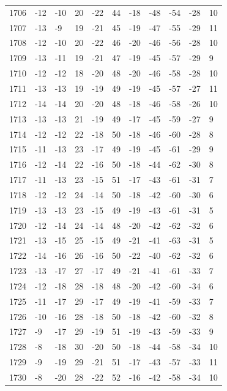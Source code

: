 \begin{table}[H]
\begin{tabular}{lllllllllll}
1706 & -12 & -10 & 20 & -22 & 44 & -18 & -48 & -54 & -28 & 10 \\
1707 & -13 & -9 & 19 & -21 & 45 & -19 & -47 & -55 & -29 & 11 \\
1708 & -12 & -10 & 20 & -22 & 46 & -20 & -46 & -56 & -28 & 10 \\
1709 & -13 & -11 & 19 & -21 & 47 & -19 & -45 & -57 & -29 & 9 \\
1710 & -12 & -12 & 18 & -20 & 48 & -20 & -46 & -58 & -28 & 10 \\
1711 & -13 & -13 & 19 & -19 & 49 & -19 & -45 & -57 & -27 & 11 \\
1712 & -14 & -14 & 20 & -20 & 48 & -18 & -46 & -58 & -26 & 10 \\
1713 & -13 & -13 & 21 & -19 & 49 & -17 & -45 & -59 & -27 & 9 \\
1714 & -12 & -12 & 22 & -18 & 50 & -18 & -46 & -60 & -28 & 8 \\
1715 & -11 & -13 & 23 & -17 & 49 & -19 & -45 & -61 & -29 & 9 \\
1716 & -12 & -14 & 22 & -16 & 50 & -18 & -44 & -62 & -30 & 8 \\
1717 & -11 & -13 & 23 & -15 & 51 & -17 & -43 & -61 & -31 & 7 \\
1718 & -12 & -12 & 24 & -14 & 50 & -18 & -42 & -60 & -30 & 6 \\
1719 & -13 & -13 & 23 & -15 & 49 & -19 & -43 & -61 & -31 & 5 \\
1720 & -12 & -14 & 24 & -14 & 48 & -20 & -42 & -62 & -32 & 6 \\
1721 & -13 & -15 & 25 & -15 & 49 & -21 & -41 & -63 & -31 & 5 \\
1722 & -14 & -16 & 26 & -16 & 50 & -22 & -40 & -62 & -32 & 6 \\
1723 & -13 & -17 & 27 & -17 & 49 & -21 & -41 & -61 & -33 & 7 \\
1724 & -12 & -18 & 28 & -18 & 48 & -20 & -42 & -60 & -34 & 6 \\
1725 & -11 & -17 & 29 & -17 & 49 & -19 & -41 & -59 & -33 & 7 \\
1726 & -10 & -16 & 28 & -18 & 50 & -18 & -42 & -60 & -32 & 8 \\
1727 & -9 & -17 & 29 & -19 & 51 & -19 & -43 & -59 & -33 & 9 \\
1728 & -8 & -18 & 30 & -20 & 50 & -18 & -44 & -58 & -34 & 10 \\
1729 & -9 & -19 & 29 & -21 & 51 & -17 & -43 & -57 & -33 & 11 \\
1730 & -8 & -20 & 28 & -22 & 52 & -16 & -42 & -58 & -34 & 10 \\

\end{tabular}
\end{table}
